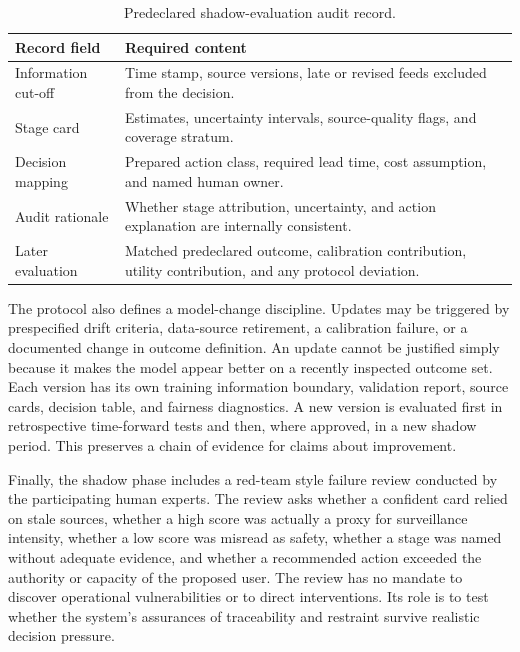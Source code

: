 \documentclass[conference]{IEEEtran}
\begin{document}
\begin{table}[t]
\caption{Predeclared shadow-evaluation audit record.}
\label{tab:audit}
\centering
\renewcommand{\arraystretch}{1.13}
\begin{tabular}{|p{}|p{}|}
\hline
\textbf{Record field} & \textbf{Required content} \\
\hline
Information cut-off & Time stamp, source versions, late or revised feeds excluded from the decision. \\
\hline
Stage card & Estimates, uncertainty intervals, source-quality flags, and coverage stratum. \\
\hline
Decision mapping & Prepared action class, required lead time, cost assumption, and named human owner. \\
\hline
Audit rationale & Whether stage attribution, uncertainty, and action explanation are internally consistent. \\
\hline
Later evaluation & Matched predeclared outcome, calibration contribution, utility contribution, and any protocol deviation. \\
\hline
\end{tabular}
\end{table}

The protocol also defines a model-change discipline. Updates may be triggered by prespecified drift criteria, data-source retirement, a calibration failure, or a documented change in outcome definition. An update cannot be justified simply because it makes the model appear better on a recently inspected outcome set. Each version has its own training information boundary, validation report, source cards, decision table, and fairness diagnostics. A new version is evaluated first in retrospective time-forward tests and then, where approved, in a new shadow period. This preserves a chain of evidence for claims about improvement.

Finally, the shadow phase includes a red-team style failure review conducted by the participating human experts. The review asks whether a confident card relied on stale sources, whether a high score was actually a proxy for surveillance intensity, whether a low score was misread as safety, whether a stage was named without adequate evidence, and whether a recommended action exceeded the authority or capacity of the proposed user. The review has no mandate to discover operational vulnerabilities or to direct interventions. Its role is to test whether the system's assurances of traceability and restraint survive realistic decision pressure.
\end{document}
